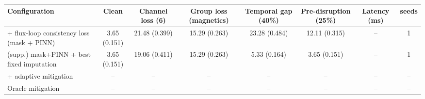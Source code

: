 \begin{tabular}{lccccccc}
\hline
Configuration & Clean & Channel loss (6) & Group loss (magnetics) & Temporal gap (40\%) & Pre-disruption (25\%) & Latency (ms) & seeds \\
\hline
+ flux-loop consistency loss (mask + PINN) & 3.65 (0.151) & 21.48 (0.399) & 15.29 (0.263) & 23.28 (0.484) & 12.11 (0.315) & -- & 1 \\
(supp.) mask+PINN + best fixed imputation & 3.65 (0.151) & 19.06 (0.411) & 15.29 (0.263) & 5.33 (0.164) & 3.65 (0.151) & -- & 1 \\
+ adaptive mitigation & -- & -- & -- & -- & -- & -- & -- \\
Oracle mitigation & -- & -- & -- & -- & -- & -- & -- \\
\hline
\end{tabular}
